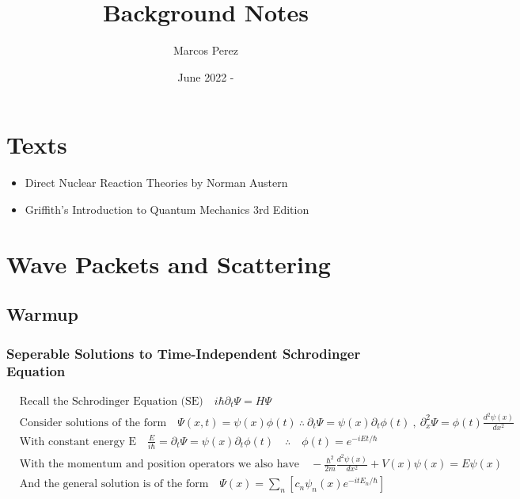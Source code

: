\documentclass[12pt]{article}
\title{Background Notes}
\author{Marcos Perez}
\date{June 2022 - }
\begin{document}
\maketitle

\section{Texts}
\begin{itemize}
    \item Direct Nuclear Reaction Theories by Norman Austern
    \item Griffith's Introduction to Quantum Mechanics 3rd Edition
\end{itemize}

\section{Wave Packets and Scattering}
\subsection{Warmup}
\subsubsection{Seperable Solutions to Time-Independent Schrodinger Equation}
\begin{align}
&\text{Recall the Schrodinger Equation (SE)}\quad i\hbar\partial_t\Psi=H\Psi\\
&\text{Consider solutions of the form}\quad \Psi(x,t)=\psi(x)\phi(t)\ \therefore\ \partial_t\Psi=\psi(x)\partial_t\phi(t)\ ,\ 
\partial^2_x\Psi=\phi(t)\frac{d^2\psi(x)}{dx^2}\\
\label{eqn:time_dep_factor}
&\text{With constant energy E}\quad \frac{E}{i\hbar}=\partial_t\Psi=\psi(x)\partial_t\phi(t)\quad\therefore\quad \phi(t)=e^{-i Et/\hbar}\\
\label{eqn:time_ind_SE}
&\text{With the momentum and position operators we also have}\quad -\frac{\hbar^2}{2m}\frac{d^2\psi(x)}{dx^2}+V(x)\psi(x)=E\psi(x) \\
&\text{And the general solution is of the form}\quad \Psi(x)=\sum_n\left[c_n\psi_n(x)e^{-itE_n/\hbar}\right]
\end{align}
\end{document}
